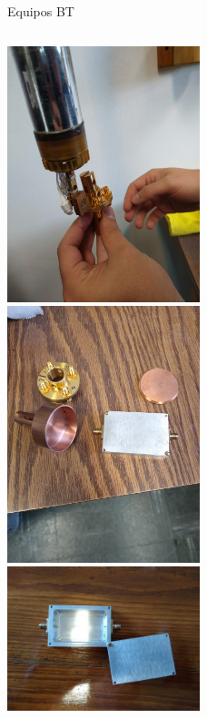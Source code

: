 \documentclass[ignorenonframetext,12pt]{beamer}
\begin{document}
\begin{frame}{Equipos BT}
\begin{columns}
\begin{column}{0.45\textwidth}
												\includegraphics[angle=-90,width=0.42\textwidth]{IMG_20190523_105647049} \\ 
												\hspace{2mm}\includegraphics[angle=-90,width=0.42\textwidth]{IMG_20190523_112752228} \\
												\includegraphics[angle=-90,width=0.42\textwidth]{IMG_20190523_104038976}
								\end{column}
				\end{columns}
%
%
%
%
\end{frame}
\end{document}
